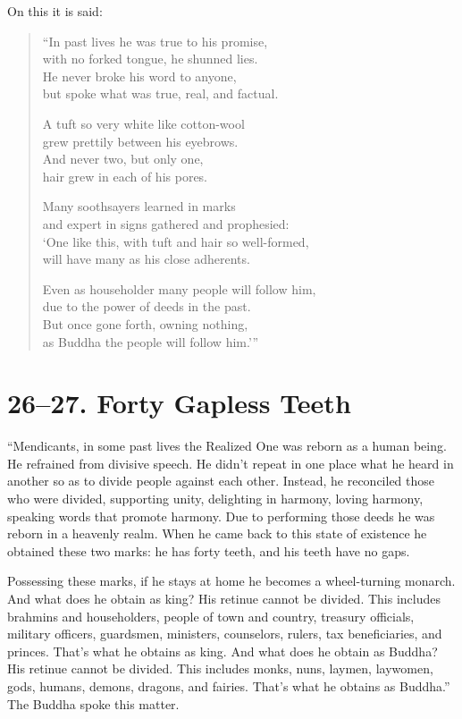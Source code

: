 \documentclass[12pt,openany]{book}%
\begin{document}
On this it is said: 

\begin{verse}%
“In past lives he was true to his promise, \\
with no forked tongue, he shunned lies. \\
He never broke his word to anyone, \\
but spoke what was true, real, and factual. 

A tuft so very white like cotton-wool \\
grew prettily between his eyebrows. \\
And never two, but only one, \\
hair grew in each of his pores. 

Many soothsayers learned in marks \\
and expert in signs gathered and prophesied: \\
‘One like this, with tuft and hair so well-formed, \\
will have many as his close adherents. 

Even as householder many people will follow him, \\
due to the power of deeds in the past. \\
But once gone forth, owning nothing, \\
as Buddha the people will follow him.’” 

%
\end{verse}

\section*{26–27. Forty Gapless Teeth }

“Mendicants, in some past lives the Realized One was reborn as a human being. He refrained from divisive speech. He didn’t repeat in one place what he heard in another so as to divide people against each other. Instead, he reconciled those who were divided, supporting unity, delighting in harmony, loving harmony, speaking words that promote harmony. Due to performing those deeds he was reborn in a heavenly realm. When he came back to this state of existence he obtained these two marks: he has forty teeth, and his teeth have no gaps. 

Possessing these marks, if he stays at home he becomes a wheel-turning monarch. And what does he obtain as king? His retinue cannot be divided. This includes brahmins and householders, people of town and country, treasury officials, military officers, guardsmen, ministers, counselors, rulers, tax beneficiaries, and princes. That’s what he obtains as king. And what does he obtain as Buddha? His retinue cannot be divided. This includes monks, nuns, laymen, laywomen, gods, humans, demons, dragons, and fairies. That’s what he obtains as Buddha.” The Buddha spoke this matter. 
\end{document}
